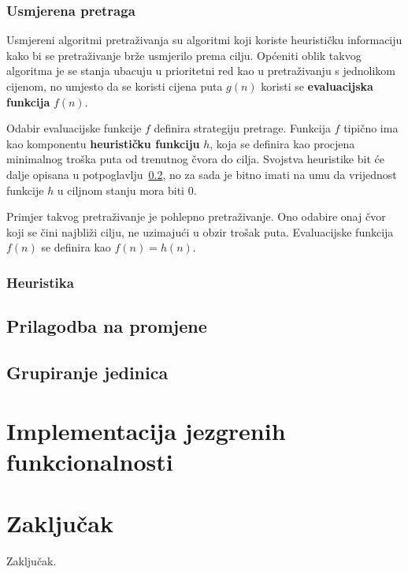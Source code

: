 \documentclass[times, utf8, zavrsni, numeric]{fer}
\begin{document}
\subsection{Usmjerena pretraga}

\par Usmjereni algoritmi pretraživanja su algoritmi koji koriste heurističku informaciju kako bi se pretraživanje brže usmjerilo prema cilju.
Općeniti oblik takvog algoritma je se stanja ubacuju u prioritetni red kao u pretraživanju s jednolikom cijenom, no umjesto da se koristi cijena puta \(g(n)\) koristi se \textbf{evaluacijska funkcija} \(f(n)\).

\par Odabir evaluacijske funkcije \(f\) definira strategiju pretrage. 
Funkcija \(f\) tipično ima kao komponentu \textbf{heurističku funkciju} \(h\), koja se definira kao procjena minimalnog troška puta od trenutnog čvora do cilja\cite{book:AIModernApproach}. Svojstva heuristike bit će dalje opisana u potpoglavlju~\ref{ssec:heuristics}, no za sada je bitno imati na umu da vrijednost funkcije \(h\) u ciljnom stanju mora biti \(0\).

\par Primjer takvog pretraživanje je pohlepno pretraživanje. 
Ono odabire onaj čvor koji se čini najbliži cilju, ne uzimajući u obzir trošak puta.
Evaluacijske funkcija \(f(n)\) se definira kao \(f(n) = h(n)\).

\subsection{Heuristika}\label{ssec:heuristics}

\section{Prilagodba na promjene}

\section{Grupiranje jedinica}

\chapter{Implementacija jezgrenih funkcionalnosti}\label{ch:implementation}

\chapter{Zaključak}\label{ch:conclusion}
Zaključak.
\end{document}
